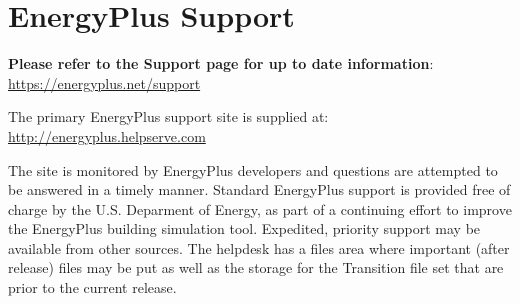 \section{EnergyPlus Support}\label{energyplus-support}

\textbf{Please refer to the Support page for up to date information}: \url{https://energyplus.net/support}

The primary EnergyPlus support site is supplied at: \url{http://energyplus.helpserve.com}

The site is monitored by EnergyPlus developers and questions are attempted to be answered in a timely manner. Standard EnergyPlus support is provided free of charge by the U.S. Deparment of Energy, as part of a continuing effort to improve the EnergyPlus building simulation tool. Expedited, priority support may be available from other sources. The helpdesk has a files area where important (after release) files may be put as well as the storage for the Transition file set that are prior to the current release.
